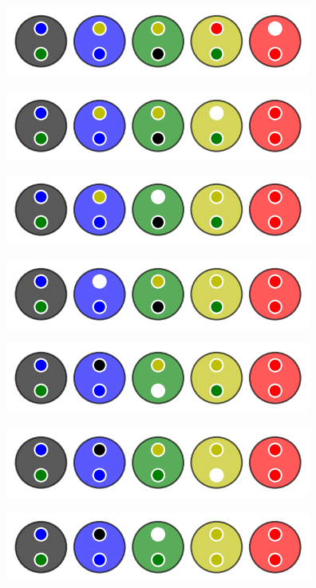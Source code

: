 \begin{multicols}{2}
\begin{center}
		\includegraphics[scale= 0.45]{content/algo_selection/example/007.png}
	\end{center}
		
	\columnbreak
	\begin{center}
		\includegraphics[scale= 0.45]{content/algo_selection/example/008.png}
		
		\includegraphics[scale= 0.45]{content/algo_selection/example/009.png}

		\includegraphics[scale= 0.45]{content/algo_selection/example/010.png}

		\includegraphics[scale= 0.45]{content/algo_selection/example/011.png}

		\includegraphics[scale= 0.45]{content/algo_selection/example/012.png}

		\includegraphics[scale= 0.45]{content/algo_selection/example/013.png}


\end{center}
\end{multicols}

